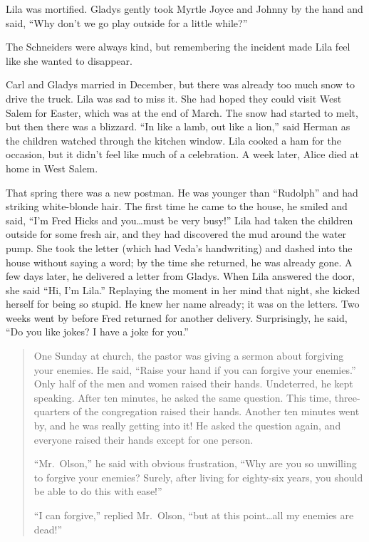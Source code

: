 \documentclass[
  american,
  letterpaper,
]{book}
\begin{document}
Lila was mortified. Gladys gently took Myrtle Joyce and Johnny by the
hand and said, ``Why don't we go play outside for a little while?''

The Schneiders were always kind, but remembering the incident made Lila
feel like she wanted to disappear.

Carl and Gladys married in December, but there was already too much snow
to drive the truck. Lila was sad to miss it. She had hoped they could
visit West Salem for Easter, which was at the end of March. The snow had
started to melt, but then there was a blizzard. ``In like a lamb, out
like a lion,'' said Herman as the children watched through the kitchen
window. Lila cooked a ham for the occasion, but it didn't feel like much
of a celebration. A week later, Alice died at home in West Salem.

That spring there was a new postman. He was younger than ``Rudolph'' and
had striking white-blonde hair. The first time he came to the house, he
smiled and said, ``I'm Fred Hicks and you\ldots must be very busy!''
Lila had taken the children outside for some fresh air, and they had
discovered the mud around the water pump. She took the letter (which had
Veda's handwriting) and dashed into the house without saying a word; by
the time she returned, he was already gone. A few days later, he
delivered a letter from Gladys. When Lila answered the door, she said
``Hi, I'm Lila.'' Replaying the moment in her mind that night, she
kicked herself for being so stupid. He knew her name already; it was on
the letters. Two weeks went by before Fred returned for another
delivery. Surprisingly, he said, ``Do you like jokes? I have a joke for
you.''

\begin{quote}
One Sunday at church, the pastor was giving a sermon about forgiving
your enemies. He said, ``Raise your hand if you can forgive your
enemies.'' Only half of the men and women raised their hands.
Undeterred, he kept speaking. After ten minutes, he asked the same
question. This time, three-quarters of the congregation raised their
hands. Another ten minutes went by, and he was really getting into it!
He asked the question again, and everyone raised their hands except for
one person.

``Mr.~Olson,'' he said with obvious frustration, ``Why are you so
unwilling to forgive your enemies? Surely, after living for eighty-six
years, you should be able to do this with ease!''

``I can forgive,'' replied Mr.~Olson, ``but at this point\ldots all my
enemies are dead!''
\end{quote}
\end{document}

